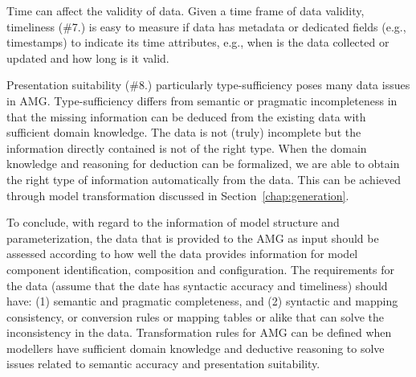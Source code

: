 Time can affect the validity of data. Given a time frame of data validity, timeliness  (\#7.) is  easy to measure if data has metadata or dedicated fields (e.g., timestamps) to indicate its time attributes, e.g., when is the data collected or updated and how long is it valid. %

Presentation suitability (\#8.) particularly type-sufficiency poses many data issues in AMG. 
Type-sufficiency differs from semantic or pragmatic incompleteness in that the missing information can be deduced from the existing data with sufficient domain knowledge. The data is not (truly) incomplete but the information directly contained is not of the right type. 
When the domain knowledge and reasoning for deduction can be formalized, we are able to obtain the right type of information automatically from the data. This can be achieved through model transformation discussed in Section~\ref{chap:generation}. 

To conclude, with regard to the information of model structure and parameterization, the data that is provided to the AMG as input should be assessed according to how well the data provides information for model component identification, composition and configuration. 
The requirements for the data (assume that the date has syntactic accuracy and timeliness) should have: 
(1) semantic and pragmatic completeness, and 
(2) syntactic and mapping consistency, or conversion rules or mapping tables or alike that can solve the inconsistency in the data. 
Transformation rules for AMG can be defined when modellers have sufficient domain knowledge and deductive reasoning  to  solve issues related to semantic accuracy and presentation suitability. 
